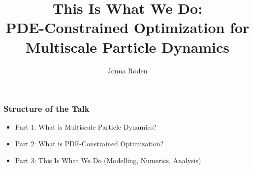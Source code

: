 \documentclass[aspectratio=169,xcolor=dvipsnames]{beamer}
\begin{document}
\title[]{This Is What We Do: \\
PDE-Constrained Optimization for Multiscale Particle Dynamics}
\author[Jonna Roden]{Jonna Roden}
\titlepage
 
 
\begin{frame}
	\frametitle{Structure of the Talk}
	 
	 \begin{itemize}
	 	\item Part 1: What is Multiscale Particle Dynamics?
	 	\item Part 2: What is PDE-Constrained Optimization?
	 	\item Part 3: This Is What We Do (Modelling, Numerics, Analysis)
	 \end{itemize}
\end{frame}
\end{document}
